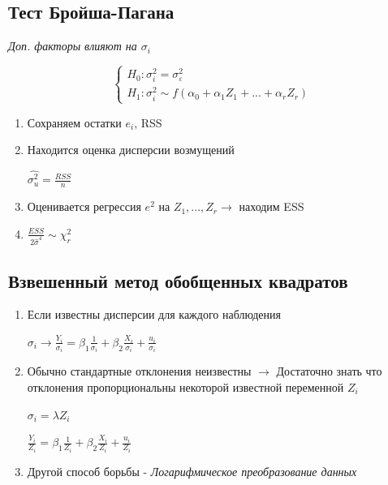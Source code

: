 \documentclass[a4paper, 12pt]{article}
\begin{document}
\subsection{Тест Бройша-Пагана}

\begin{center}
    \textit{Доп. факторы влияют на $\sigma_{i}$}
\end{center}

\[\begin{cases}
    H_{0}: \sigma_{i}^{2} = \sigma_{\varepsilon}^{2} \\
    H_{1}: \sigma_{i}^{2} \sim f(\alpha_{0} + \alpha_{1}Z_{1} + ... + \alpha_{r}Z_{r})
\end{cases}\]

\begin{enumerate}
    \item Сохраняем остатки $e_{i}$, RSS
    \item Находится оценка дисперсии возмущений
    
    $\hat{\sigma_{u}^{2}} = \frac{RSS}{n}$
    \item Оценивается регрессия $e^{2}$ на $Z_{1}, ..., Z_{r} \rightarrow$ находим ESS
    \item $\frac{ESS}{2\hat{\sigma}^{4}} \sim \chi^{2}_{r}$
\end{enumerate}

\subsection{Взвешенный метод обобщенных квадратов}

\begin{enumerate}
    \item Если известны дисперсии для каждого наблюдения 
    
    $\sigma_{i} \rightarrow \frac{Y_{i}}{\sigma_{i}} = \beta_{1}\frac{1}{\sigma_{i}} + \beta_{2}\frac{X_{i}}{\sigma_{i}} + \frac{u_{i}}{\sigma_{i}}$ 
    
    \item Обычно стандартные отклонения неизвестны $\rightarrow$ Достаточно знать что отклонения пропорциональны некоторой известной переменной $Z_{i}$
    
    $\sigma_{i} = \lambda Z_{i}$
    
    $\frac{Y_{i}}{Z_{i}} = \beta_{1}\frac{1}{Z_{i}} + \beta_{2}\frac{X_{i}}{Z_{i}} + \frac{u_{i}}{Z_{i}}$
    
    \item Другой способ борьбы - \textit{Логарифмическое преобразование данных}
\end{enumerate}
\end{document}
